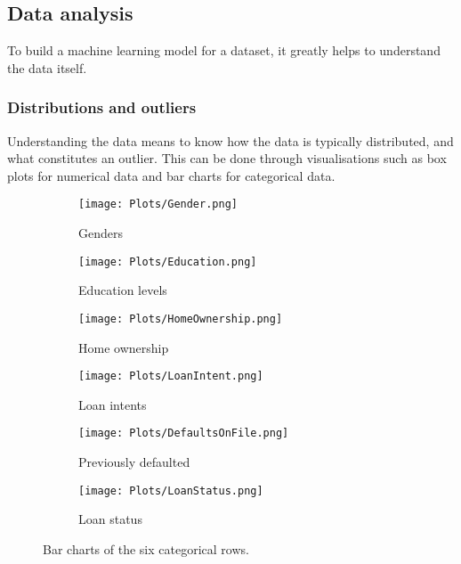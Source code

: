 \pagebreak

\subsection{Data analysis} %
To build a machine learning model for a dataset, it greatly helps to understand the data itself.

\subsubsection{Distributions and outliers}
Understanding the data means to know how the data is typically distributed, and what constitutes an outlier. This can be 
done through visualisations such as box plots for numerical data and bar charts for categorical data.

\begin{figure}[H]
    \centering
    \begin{subfigure}[b]{0.3\textwidth}
        \centering
        \texttt{[image: Plots/Gender.png]}
        \caption{Genders}
        \label{fig:Bar1}
    \end{subfigure}
    \hfill
    \begin{subfigure}[b]{0.3\textwidth}
        \centering
        \texttt{[image: Plots/Education.png]}
        \caption{Education levels}
        \label{fig:Bar2}
    \end{subfigure}
    \hfill
    \begin{subfigure}[b]{0.3\textwidth}
        \centering
        \texttt{[image: Plots/HomeOwnership.png]}
        \caption{Home ownership}
        \label{fig:Bar3}
    \end{subfigure}
    
    \vspace{1em}
    
    \begin{subfigure}[b]{0.3\textwidth}
        \centering
        \texttt{[image: Plots/LoanIntent.png]}
        \caption{Loan intents}
        \label{fig:Bar4}
    \end{subfigure}
    \hfill
    \begin{subfigure}[b]{0.3\textwidth}
        \centering
        \texttt{[image: Plots/DefaultsOnFile.png]}
        \caption{Previously defaulted}
        \label{fig:Bar5}
    \end{subfigure}
    \hfill
    \begin{subfigure}[b]{0.3\textwidth}
        \centering
        \texttt{[image: Plots/LoanStatus.png]}
        \caption{Loan status}
        \label{fig:Bar6}
    \end{subfigure}
    \caption{Bar charts of the six categorical rows.}
    \label{fig:BarCharts}
\end{figure}

